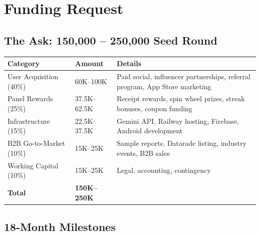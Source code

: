 \documentclass[11pt,a4paper]{article}
\begin{document}
\section{Funding Request}

\subsection{The Ask: \texteuro{}150,000 -- \texteuro{}250,000 Seed Round}

\begin{center}
\renewcommand{\arraystretch}{1.5}
\begin{tabularx}{\textwidth}{L{4.5cm} R{3cm} L{6cm}}
\toprule
{}
\textbf{\color{white}Category} & \textbf{\color{white}Amount} & \textbf{\color{white}Details} \\
\midrule
User Acquisition (40\%) & \texteuro{}60K--100K & Paid social, influencer partnerships, referral program, App Store marketing \\
Panel Rewards (25\%) & \texteuro{}37.5K--62.5K & Receipt rewards, spin wheel prizes, streak bonuses, coupon funding \\
Infrastructure (15\%) & \texteuro{}22.5K--37.5K & Gemini API, Railway hosting, Firebase, Android development \\
B2B Go-to-Market (10\%) & \texteuro{}15K--25K & Sample reports, Datarade listing, industry events, B2B sales \\
Working Capital (10\%) & \texteuro{}15K--25K & Legal, accounting, contingency \\
\midrule
\textbf{Total} & \textbf{\texteuro{}150K--250K} & \\
\bottomrule
\end{tabularx}
\end{center}

\subsection{18-Month Milestones}
\end{document}
